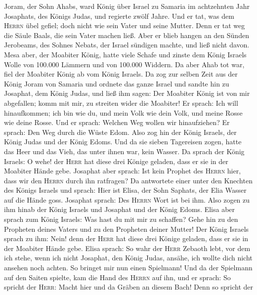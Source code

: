  Joram, der Sohn Ahabs, ward König über Israel zu Samaria
im achtzehnten Jahr Josaphats, des Königs Judas, und regierte zwölf
Jahre.  Und er tat, was dem \textsc{Herrn} übel gefiel;
doch nicht wie sein Vater und seine Mutter. Denn er tat weg die Säule
Baals, die sein Vater machen ließ.  Aber er blieb hangen
an den Sünden Jerobeams, des Sohnes Nebats, der Israel sündigen machte,
und ließ nicht davon.  Mesa aber, der Moabiter König,
hatte viele Schafe und zinste dem König Israels Wolle von 100.000
Lämmern und von 100.000 Widdern.  Da aber Ahab tot war,
fiel der Moabiter König ab vom König Israels.  Da zog zur
selben Zeit aus der König Joram von Samaria und ordnete das ganze Israel
 und sandte hin zu Josaphat, dem König Judas, und ließ ihm
sagen: Der Moabiter König ist von mir abgefallen; komm mit mir, zu
streiten wider die Moabiter! Er sprach: Ich will hinaufkommen; ich bin
wie du, und mein Volk wie dein Volk, und meine Rosse wie deine Rosse.
 Und er sprach: Welchen Weg wollen wir hinaufziehen? Er
sprach: Den Weg durch die Wüste Edom.  Also zog hin der
König Israels, der König Judas und der König Edoms. Und da sie sieben
Tagereisen zogen, hatte das Heer und das Vieh, das unter ihnen war, kein
Wasser.  Da sprach der König Israels: O wehe! der
\textsc{Herr} hat diese drei Könige geladen, dass er sie in der Moabiter
Hände gebe.  Josaphat aber sprach: Ist kein Prophet des
\textsc{Herrn} hier, dass wir den \textsc{Herrn} durch ihn ratfragen? Da
antwortete einer unter den Knechten des Königs Israels und sprach: Hier
ist Elisa, der Sohn Saphats, der Elia Wasser auf die Hände goss.
 Josaphat sprach: Des \textsc{Herrn} Wort ist bei ihm.
Also zogen zu ihm hinab der König Israels und Josaphat und der König
Edoms.  Elisa aber sprach zum König Israels: Was hast du
mit mir zu schaffen? Gehe hin zu den Propheten deines Vaters und zu den
Propheten deiner Mutter! Der König Israels sprach zu ihm: Nein! denn der
\textsc{Herr} hat diese drei Könige geladen, dass er sie in der Moabiter
Hände gebe.  Elisa sprach: So wahr der \textsc{Herr}
Zebaoth lebt, vor dem ich stehe, wenn ich nicht Josaphat, den König
Judas, ansähe, ich wollte dich nicht ansehen noch achten.
 So bringet mir nun einen Spielmann! Und da der Spielmann
auf den Saiten spielte, kam die Hand des \textsc{Herrn} auf ihn,
 und er sprach: So spricht der \textsc{Herr}: Macht hier
und da Gräben an diesem Bach!  Denn so spricht der
